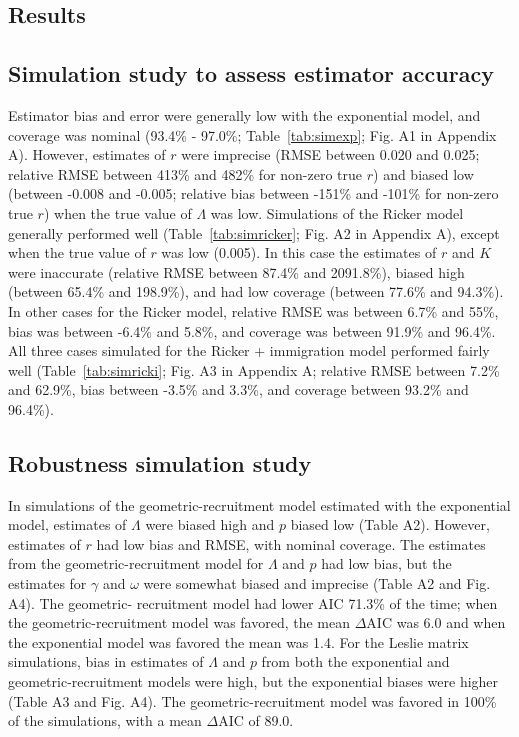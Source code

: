 \documentclass[12pt,english]{article}
\begin{document}
\begin{spacing}{1.9}
\begin{flushleft}
\section*{Results}

\subsection*{Simulation study to assess estimator accuracy}

Estimator bias and error were generally low with the exponential model, and 
coverage was nominal (93.4\% - 97.0\%; Table~\ref{tab:simexp}; Fig. A1 in Appendix A). 
However, estimates of $r$ were 
imprecise (RMSE between 0.020 and 0.025; relative RMSE between 413\% and 
482\% for non-zero true $r$) and biased low (between -0.008 and -0.005; relative bias between
-151\% and -101\% for non-zero true $r$) when the true value of
$\Lambda$ was low. 
Simulations of the Ricker model 
generally performed well (Table~\ref{tab:simricker}; Fig. A2 in Appendix A), except when the true value of $r$ was low (0.005). In this case the 
estimates of $r$ and $K$ were inaccurate (relative RMSE between 87.4\% and 2091.8\%),
biased high (between 65.4\% and 198.9\%), and had low coverage (between 77.6\% and 94.3\%).
In other cases for the Ricker model, relative RMSE was between 6.7\%
and 55\%, bias was between -6.4\% and 5.8\%, and coverage was between
91.9\% and 96.4\%.  All three cases simulated for the Ricker + immigration model 
performed fairly well (Table~\ref{tab:simricki}; Fig. A3 in Appendix A; relative RMSE between 7.2\% 
and 62.9\%, bias between -3.5\% and 3.3\%, and coverage between
93.2\% and 96.4\%).  
  
\subsection*{Robustness simulation study}
In simulations of the geometric-recruitment model estimated with the exponential model,
estimates of $\Lambda$ were biased high 
and $p$ biased low (Table A2). 
However, estimates of $r$ had low bias and RMSE, with nominal coverage. 
The estimates from the geometric-recruitment model for $\Lambda$ and $p$ had low bias, but the estimates
for $\gamma$ and $\omega$ were somewhat biased and imprecise (Table A2 and Fig. A4).
The geometric- recruitment model had lower
AIC 71.3\% of the time; when the geometric-recruitment model was favored, the
mean $\Delta$AIC was 6.0 and when the exponential model was favored
the mean was 1.4.  
For the Leslie matrix simulations, bias in estimates of $\Lambda$ and $p$ from both the exponential and geometric-recruitment models
were high, but the exponential biases were higher (Table A3 and Fig. A4).  
The geometric-recruitment model was favored in 100\% of the simulations, 
with a mean $\Delta$AIC of 89.0.  


\end{flushleft}
\end{spacing}
\end{document}

